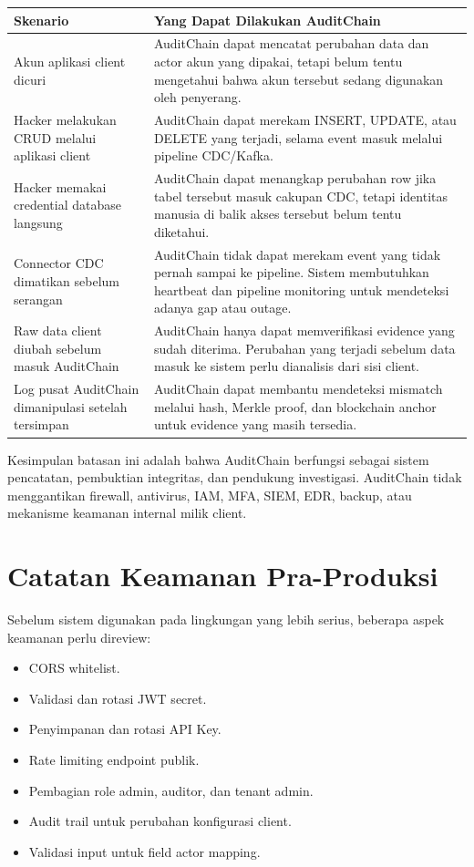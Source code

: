 \begin{longtable}{p{5cm}p{8cm}}
\toprule
\textbf{Skenario} & \textbf{Yang Dapat Dilakukan AuditChain} \\
\midrule
Akun aplikasi client dicuri & AuditChain dapat mencatat perubahan data dan actor akun yang dipakai, tetapi belum tentu mengetahui bahwa akun tersebut sedang digunakan oleh penyerang. \\
\midrule
Hacker melakukan CRUD melalui aplikasi client & AuditChain dapat merekam INSERT, UPDATE, atau DELETE yang terjadi, selama event masuk melalui pipeline CDC/Kafka. \\
\midrule
Hacker memakai credential database langsung & AuditChain dapat menangkap perubahan row jika tabel tersebut masuk cakupan CDC, tetapi identitas manusia di balik akses tersebut belum tentu diketahui. \\
\midrule
Connector CDC dimatikan sebelum serangan & AuditChain tidak dapat merekam event yang tidak pernah sampai ke pipeline. Sistem membutuhkan heartbeat dan pipeline monitoring untuk mendeteksi adanya gap atau outage. \\
\midrule
Raw data client diubah sebelum masuk AuditChain & AuditChain hanya dapat memverifikasi evidence yang sudah diterima. Perubahan yang terjadi sebelum data masuk ke sistem perlu dianalisis dari sisi client. \\
\midrule
Log pusat AuditChain dimanipulasi setelah tersimpan & AuditChain dapat membantu mendeteksi mismatch melalui hash, Merkle proof, dan blockchain anchor untuk evidence yang masih tersedia. \\
\bottomrule
\end{longtable}

Kesimpulan batasan ini adalah bahwa AuditChain berfungsi sebagai sistem pencatatan, pembuktian integritas, dan pendukung investigasi. AuditChain tidak menggantikan firewall, antivirus, IAM, MFA, SIEM, EDR, backup, atau mekanisme keamanan internal milik client.

\section{Catatan Keamanan Pra-Produksi}

Sebelum sistem digunakan pada lingkungan yang lebih serius, beberapa aspek keamanan perlu direview:

\begin{itemize}
    \item CORS whitelist.
    \item Validasi dan rotasi JWT secret.
    \item Penyimpanan dan rotasi API Key.
    \item Rate limiting endpoint publik.
    \item Pembagian role admin, auditor, dan tenant admin.
    \item Audit trail untuk perubahan konfigurasi client.
    \item Validasi input untuk field actor mapping.
\end{itemize}
